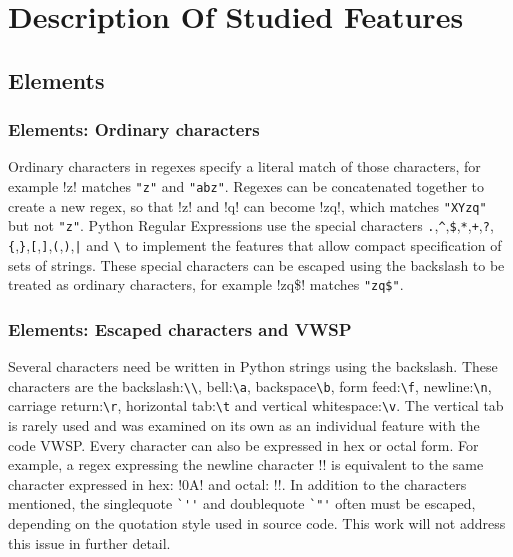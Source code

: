 \section{Description Of Studied Features}
\label{sec:featureDescriptions}

\subsection*{Elements}

\subsubsection*{Elements: Ordinary characters}

Ordinary characters in regexes specify a literal match of those characters, for example \cverb!z! matches \verb!"z"! and \verb!"abz"!.  Regexes can be concatenated together to create a new regex, so that \cverb!z! and \cverb!q! can become \cverb!zq!, which matches \verb!"XYzq"! but not \verb!"z"!.  Python Regular Expressions use the special characters \verb!.!,\verb!^!,\verb!$!,\verb!*!,\verb!+!,\verb!?!,\verb!{!,\verb!}!,\verb![!,\verb!]!,\verb!(!,\verb!)!,\verb!|! and \verb!\! to implement the features that allow compact specification of sets of strings.  These special characters can be escaped using the backslash to be treated as ordinary characters, for example \cverb!zq\$! matches \verb!"zq$"!.

\subsubsection*{Elements: Escaped characters and VWSP}

Several characters need be written in Python strings using the backslash.  These characters are the backslash:\verb!\\!, bell:\verb!\a!, backspace\verb!\b!, form feed:\verb!\f!, newline:\verb!\n!, carriage return:\verb!\r!, horizontal tab:\verb!\t! and vertical whitespace:\verb!\v!.  The vertical tab is rarely used and was examined on its own as an individual feature with the code VWSP.  Every character can also be expressed in hex or octal form.  For example, a regex expressing the newline character \cverb!\n! is equivalent to the same character expressed in hex: \cverb!\x0A! and octal: \cverb!!.  In addition to the characters mentioned, the singlequote \verb!`''! and doublequote \verb!`"'! often must be escaped, depending on the quotation style used in source code.  This work will not address this issue in further detail.

